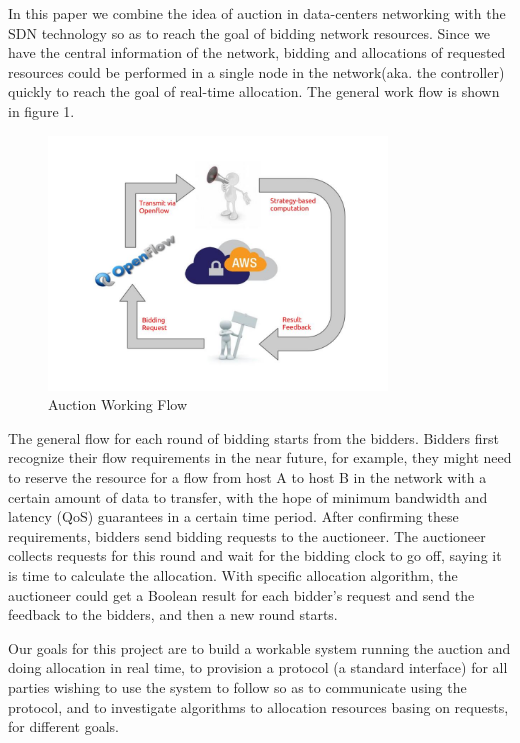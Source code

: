 \documentclass[a4paper,11pt,twocolumn]{article}
\begin{document}
In this paper we combine the idea of auction in data-centers networking with the SDN technology so as to reach the goal of bidding network resources. 
Since we have the central information of the network, bidding and allocations of requested resources could be performed in a single node in the network(aka. the controller) quickly to reach the goal of real-time allocation. The general work flow is shown in figure 1. 

\begin{figure}[ht!]
\centering
\includegraphics[width=90mm]{general_flow.jpg}
\caption{Auction Working Flow}
\label{overflow}
\end{figure}



The general flow for each round of bidding starts from the bidders. Bidders first recognize their flow requirements in the near future, for example, they might need to reserve the resource for a flow 
from host A to host B in the network with a certain amount of data to transfer, with the hope of minimum bandwidth and latency (QoS) guarantees in 
a certain time period. After confirming these requirements, bidders send bidding requests to the auctioneer. The auctioneer collects requests for this 
round and wait for the bidding clock to go off, saying it is time to calculate the allocation. With specific allocation algorithm, the auctioneer could
get a Boolean result for each bidder's request and send the feedback to the bidders, and then a new round starts.

Our goals for this project are  to build a workable system running the auction and doing allocation in real time,  to provision a 
protocol (a standard interface) for all parties wishing to use the system to follow so as to communicate using the protocol, and  to investigate
algorithms to allocation resources basing on requests, for different goals. 
\end{document}
